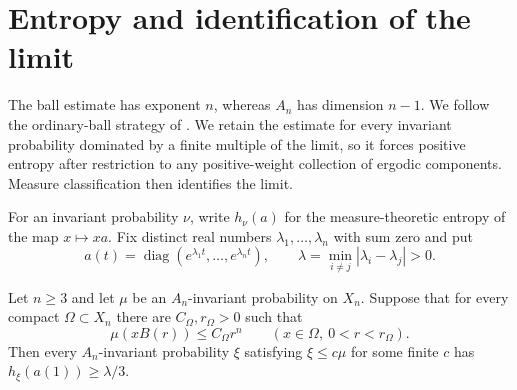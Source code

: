 \section{Entropy and identification of the limit}\label{sec:entropy}

The ball estimate has exponent $n$, whereas $A_n$ has dimension $n-1$.
We follow the ordinary-ball strategy of
\cite[Section~2.7.1]{ELMV2011}. We retain the estimate for every invariant
probability dominated by a finite multiple of the limit, so it forces
positive entropy after restriction to any positive-weight collection of
ergodic components. Measure classification then identifies the limit.

For an invariant probability $\nu$, write $h_\nu(a)$ for the
measure-theoretic entropy of the map $x\mapsto xa$.
Fix distinct real numbers $\lambda_1,\ldots,\lambda_n$ with sum zero and put
\[
 a(t)=\operatorname{diag}(e^{\lambda_1t},\ldots,e^{\lambda_nt}),
 \qquad \lambda=\min_{i\ne j}|\lambda_i-\lambda_j|>0.
\]

\begin{proposition}\label{prop:entropy-from-balls}
Let $n\ge3$ and let $\mu$ be an $A_n$-invariant probability on $X_n$.
Suppose that for every compact $\Omega\subset X_n$ there are
$C_\Omega,r_\Omega>0$ such that
\[
 \mu(xB(r))\le C_\Omega r^n
 \qquad(x\in\Omega,\ 0<r<r_\Omega).
\]
Then every $A_n$-invariant probability $\xi$ satisfying $\xi\le c\mu$
for some finite $c$ has $h_\xi(a(1))\ge\lambda/3$.
\end{proposition}

